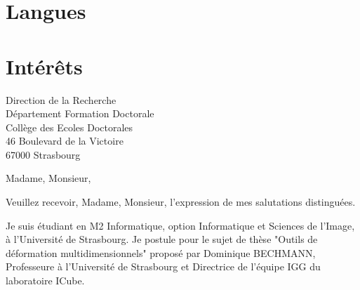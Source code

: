 \documentclass[11pt,a4paper,sans]{moderncv}        %
\begin{document}
\section{Langues}
\section{Intérêts}

% 


\clearpage
{Direction de la Recherche\\
Département Formation Doctorale\\
Collège des Ecoles Doctorales\\
46 Boulevard de la Victoire\\
67000 Strasbourg}
\date{\mydateformat\today}
\opening{Madame, Monsieur,}
\closing{Veuillez recevoir, Madame, Monsieur, l'expression de mes salutations distinguées.}
\makelettertitle

Je suis étudiant en M2 Informatique, option Informatique et Sciences de l'Image, à l'Université de Strasbourg. Je postule pour le sujet de thèse "Outils de déformation multidimensionnels" proposé par Dominique BECHMANN, Professeure à l'Université de Strasbourg et Directrice de l'équipe IGG du laboratoire ICube.
\end{document}

